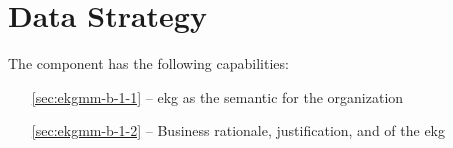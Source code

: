 \chapter{Data Strategy}\label{ch:ekgmm-b-1} %

The  component has the following capabilities:

\begin{itemize}[leftmargin=.5in]
    \item [\ref{sec:ekgmm-b-1-1}]  -- \gls{ekg} as the semantic  for the organization
    \item [\ref{sec:ekgmm-b-1-2}]  -- Business rationale, justification, and  of the \gls{ekg}
\end{itemize}


